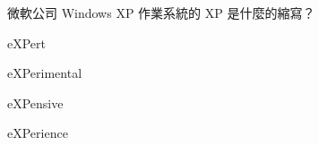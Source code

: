 \ifx\ntpcNinetyThree\undefined[93學年基北區] \fi
微軟公司 Windows XP 作業系統的 XP 是什麼的縮寫？
  \begin{optionlist}
  \item eXPert
  \item eXPerimental
  \item eXPensive
  \item eXPerience\label{ntpc-93-a18}
  \end{optionlist}
